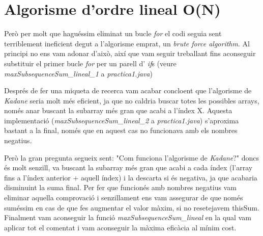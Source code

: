 \documentclass[a4paper, 12pt]{article}
\begin{document}
\section{Algorisme d'ordre lineal O(N)}
Però per molt que haguéssim eliminat un bucle \textit{for} el codi seguia sent terriblement ineficient degut a l'algorisme emprat, un \textit{brute force algorithm}.
Al principi no ens vam adonar d'això, així que vam seguir treballant fins aconseguir substituir el primer bucle \textit{for} per un parell d' \textit{if}s (veure \textit{maxSubsequenceSum\_lineal\_1} a \textit{practica1.java})

Després de fer una miqueta de recerca vam acabar concloent que l'algorisme de \textit{Kadane} seria molt més eficient, ja que no caldria buscar totes les possibles arrays, només anar buscant la subarray més gran que acabi a l'índex X.
Aquesta implementació (\textit{maxSubsequenceSum\_lineal\_2} a \textit{practica1.java}) s'aproxima bastant a la final, només que en aquest cas no funcionava amb els nombres negatius.

Però la gran pregunta segueix sent: "Com funciona l'algorisme de \textit{Kadane}?" doncs és molt senzill, va buscant la subarray més gran que acabi a cada índex (l'array fins a l'índex anterior + aquell índex) i la descarta si és negativa, ja que acabaria disminuint la suma final.
Per fer que funcionés amb nombres negatius vam eliminar aquella comprovació i senzillament ens vam assegurar de que només suméssim en cas de que fes augmentar el valor màxim, si no resetejavem thisSum.
Finalment vam aconseguir la funció \textit{maxSubsequenceSum\_lineal} en la qual vam aplicar tot el comentat i vam aconseguir la màxima eficàcia al mínim cost.
\end{document}
